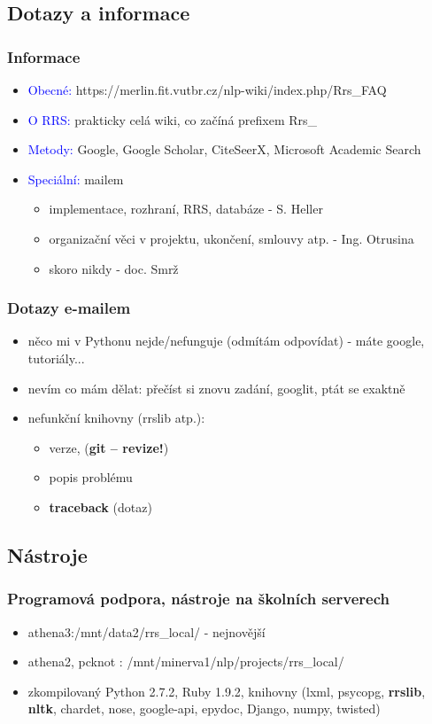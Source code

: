 \documentclass{beamer}
\begin{document}
\subsection{Dotazy a informace}
\begin{frame}
  \frametitle{Informace}
  \begin{itemize}
    \item \textcolor{blue}{Obecné:} https://merlin.fit.vutbr.cz/nlp-wiki/index.php/Rrs\_FAQ
    \item \textcolor{blue}{O RRS:} prakticky celá wiki, co začíná prefixem Rrs\_
    \item \textcolor{blue}{Metody:} Google, Google Scholar, CiteSeerX, Microsoft Academic Search
    \item \textcolor{blue}{Speciální:} mailem
    \begin{itemize}
      \item implementace, rozhraní, RRS, databáze - S. Heller
      \item organizační věci v projektu, ukončení, smlouvy atp. - Ing. Otrusina
      \item skoro nikdy - doc. Smrž
    \end{itemize}
  \end{itemize}
\end{frame}

\begin{frame}
  \frametitle{Dotazy e-mailem}
  \begin{itemize}
    \item něco mi v Pythonu nejde/nefunguje (odmítám odpovídat) - máte google, tutoriály...
    \item nevím co mám dělat: přečíst si znovu zadání, googlit, ptát se exaktně
    \item nefunkční knihovny (rrslib atp.):
    \begin{itemize}
      \item verze, (\textbf{git – revize!})
      \item popis problému
      \item \textbf{traceback} (dotaz)
    \end{itemize}
  \end{itemize}
\end{frame}

\subsection{Nástroje}
\begin{frame}
  \frametitle{Programová podpora, nástroje na školních serverech}
  \begin{itemize}
    \item athena3:/mnt/data2/rrs\_local/ - nejnovější
    \item athena2, pcknot : /mnt/minerva1/nlp/projects/rrs\_local/
    \item zkompilovaný Python 2.7.2, Ruby 1.9.2, knihovny (lxml, psycopg, \textbf{rrslib},
          \textbf{nltk}, chardet, nose, google-api, epydoc, Django, numpy, twisted)
  \end{itemize}
\end{frame}
\end{document}
